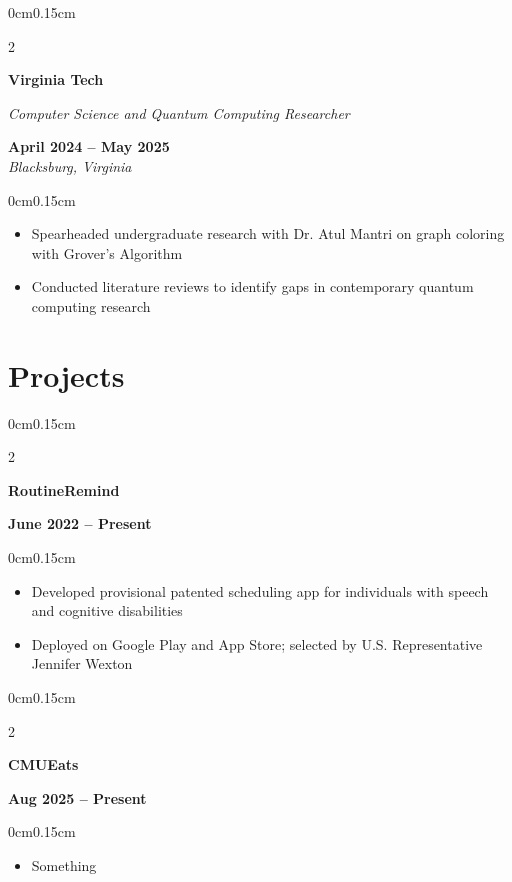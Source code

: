 \documentclass[10pt, letterpaper]{article}
\newenvironment{highlights}{
    \begin{itemize}[topsep=0pt, parsep=0pt, partopsep=0pt, itemsep=0pt, leftmargin=0.6cm]
}{
    \end{itemize}
}
\newenvironment{onecolentry}{
    \begin{adjustwidth}{0cm}{0.15cm}
}{
    \end{adjustwidth}
}
\newenvironment{twocolentry}[2][]{
    \onecolentry
    \def\secondColumn{#2}
    \setcolumnwidth{\fill, 4cm}
    \begin{paracol}{2}
}{
    \switchcolumn \raggedleft \secondColumn
    \end{paracol}
    \endonecolentry
}
\begin{document}
    \vspace{0.05cm}
    \begin{twocolentry}{\textbf{April 2024 -- May 2025} \\ \textit{Blacksburg, Virginia}}
        \textbf{Virginia Tech}
        
        \textit{Computer Science and Quantum Computing Researcher}
    \end{twocolentry}

    \begin{onecolentry}
        \begin{highlights}
            \item Spearheaded undergraduate research with Dr. Atul Mantri on graph coloring with Grover's Algorithm
            \item Conducted literature reviews to identify gaps in contemporary quantum computing research
        \end{highlights}
    \end{onecolentry}

    \vspace{0.05cm}
    \section{Projects}
    \vspace{0.1cm}

    \begin{twocolentry}{\textbf{June 2022 -- Present}}
        \textbf{RoutineRemind}
    \end{twocolentry}

    \begin{onecolentry}
        \begin{highlights}
            \item Developed provisional patented scheduling app for individuals with speech and cognitive disabilities
            \item Deployed on Google Play and App Store; selected by U.S. Representative Jennifer Wexton
        \end{highlights}
    \end{onecolentry}

    \vspace{0.05cm}

    \begin{twocolentry}{\textbf{Aug 2025 -- Present}}
        \textbf{CMUEats}
    \end{twocolentry}

    \begin{onecolentry}
        \begin{highlights}
            \item Something
        \end{highlights}
    \end{onecolentry}
\end{document}
